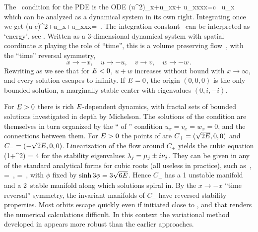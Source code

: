 The \eqv\ condition for the {\KS} PDE 
is the ODE
\beq
{\textstyle{}}(u^2)_x+u_{xx}+ u_{xxxx}=c \, u_x
which can be analyzed as a dynamical system in its own right.
Integrating once we get
\beq
{\textstyle{}}(u-c)^2+u_x+u_{xxx}=\expctE
\,.
\label{eq:stdks}
\eeq
The integration constant \expctE\ can be interpreted as `energy',
see .
Written as a 3-dimen\-si\-on\-al dynamical system
with spatial coordinate $x$ playing the role of ``time'',
this is a volume preserving flow
\beq
{}
\,,
  \label{eq:3dks}
\eeq
with the ``time'' reversal symmetry,
\[
x \to -x,\quad u \to -u, \quad v \to v, \quad w \to -w \,.
\]
 Rewriting  as
\beq
{}
we see that
for $\expctE<0$, $u+w$ increases without bound with $x \to \infty$,
and every solution escapes to infinity.
If $\expctE=0$, the origin $(0,0,0)$ is the
only bounded  solution, a marginally stable center with
eigenvalues $(0, i,-i)$.

For $\expctE>0$ there is rich
$\expctE$-dependent dynamics, with
fractal sets of bounded solutions investigated in
depth by Michelson.
The solutions of the {\eqv}  condition
 are themselves in turn organized by the
``{\eqva}  of {\eqva}''  condition
\( u_x= v_x= w_x= 0 \), and
the connections between them.
    For $\expctE>0$ the {\eqv}  points of  are
$C_{+}=(\sqrt{2\expctE},0,0)$ and $C_{-}=(-\sqrt{2\expctE},0,0)$.
Linearization of the flow around
$C_{+}$ yields the cubic equation
  \beq
\eigExp(1+\eigExp^2) = 4 \expctE
for the
stability eigenvalues
$\eigExp[j] = \eigRe[j] \pm i \eigIm[j]$.
They can
be given in any of the standard analytical forms for cubic
roots  (all useless in practice), such as
    \,,\qquad
\eigRe=\sinh \phi
\,,\qquad
\eigIm=\cosh \phi \, ,
with $\phi$ fixed by $\sinh 3\phi=3\sqrt{6\expctE}$.
Hence $C_{+}$ has a {1\dmn}
unstable manifold and a 2\dmn\ stable manifold
along which solutions spiral in.
By the $x \to -x$ ``time reversal'' symmetry, the
invariant manifolds of $C_{-}$
have reversed stability properties.
Most orbits escape quickly even if initiated close to \eqva, and that
renders the numerical calculations
difficult.
In this context the variational method
developed in 
appears more robust than
the earlier approaches.


